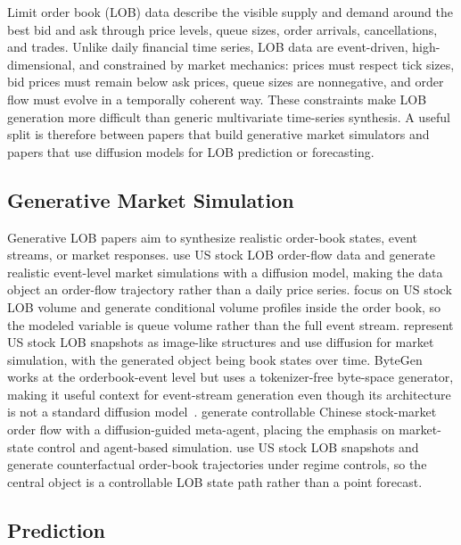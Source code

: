 \documentclass[sigconf,nonacm]{acmart}
\begin{document}
Limit order book (LOB) data describe the visible supply and demand around the
best bid and ask through price levels, queue sizes, order arrivals, cancellations,
and trades. Unlike daily financial time series, LOB data are event-driven,
high-dimensional, and constrained by market mechanics: prices must respect tick
sizes, bid prices must remain below ask prices, queue sizes are nonnegative, and
order flow must evolve in a temporally coherent way. These constraints make LOB
generation more difficult than generic multivariate time-series synthesis. A
useful split is therefore between papers that build generative market simulators
and papers that use diffusion models for LOB prediction or forecasting.

\subsection{Generative Market Simulation}\label{sec:lob-sim}

Generative LOB papers aim to synthesize realistic order-book states, event
streams, or market responses. \citet{berti2025trades} use US stock LOB order-flow
data and generate realistic event-level market simulations with a diffusion
model, making the data object an order-flow trajectory rather than a daily price
series. \citet{wang2025diffvolume} focus on US stock LOB volume and generate
conditional volume profiles inside the order book, so the modeled variable is
queue volume rather than the full event stream. \citet{backhouse2025painting}
represent US stock LOB snapshots as image-like structures and use diffusion for
market simulation, with the generated object being book states over time.
ByteGen works at the orderbook-event level but uses a tokenizer-free byte-space
generator, making it useful context for event-stream generation even though its
architecture is not a standard diffusion model~\cite{li2025bytegen}.
\citet{huang2024digma} generate controllable Chinese stock-market order flow with
a diffusion-guided meta-agent, placing the emphasis on market-state control and
agent-based simulation. \citet{wang2026difflob} use US stock LOB snapshots and
generate counterfactual order-book trajectories under regime controls, so the
central object is a controllable LOB state path rather than a point forecast.

\subsection{Prediction}\label{sec:lob-pred}
\end{document}
